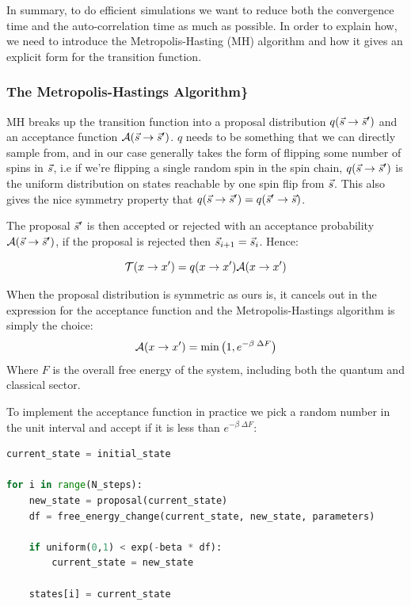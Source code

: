 In summary, to do efficient simulations we want to reduce both the
convergence time and the auto-correlation time as much as possible. In
order to explain how, we need to introduce the Metropolis-Hasting (MH)
algorithm and how it gives an explicit form for the transition function.

\hypertarget{the-metropolis-hastings-algorithm}{%
\subsubsection{The Metropolis-Hastings
Algorithm\}}\label{the-metropolis-hastings-algorithm}}

MH breaks up the transition function into a proposal distribution
\(q(\vec{s} \to \vec{s}')\) and an acceptance function \(\mathcal{A}(\vec{s} \to \vec{s}')\). \(q\)
needs to be something that we can directly sample from, and in our case
generally takes the form of flipping some number of spins in \(\vec{s}\), i.e
if we're flipping a single random spin in the spin chain,
\(q(\vec{s} \to \vec{s}')\) is the uniform distribution on states reachable by one
spin flip from \(\vec{s}\). This also gives the nice symmetry property that
\(q(\vec{s} \to \vec{s}') = q(\vec{s}' \to \vec{s})\).

The proposal \(\vec{s}'\) is then accepted or rejected with an acceptance
probability \(\mathcal{A}(\vec{s} \to \vec{s}')\), if the proposal is rejected then
\(\vec{s}_{i+1} = \vec{s}_{i}\). Hence:

\[\mathcal{T}(x\to x') = q(x\to x')\mathcal{A}(x \to x')\]

When the proposal distribution is symmetric as ours is, it cancels out
in the expression for the acceptance function and the
Metropolis-Hastings algorithm is simply the choice:
\[ \mathcal{A}(x \to x') = \min\left(1, e^{-\beta\;\Delta F}\right)\] Where \(F\)
is the overall free energy of the system, including both the quantum and
classical sector.

To implement the acceptance function in practice we pick a random number
in the unit interval and accept if it is less than
\(e^{-\beta\;\Delta F}\):

\begin{lstlisting}[language=Python]
current_state = initial_state

for i in range(N_steps):
    new_state = proposal(current_state)
    df = free_energy_change(current_state, new_state, parameters)

    if uniform(0,1) < exp(-beta * df):
        current_state = new_state
        
    states[i] = current_state
\end{lstlisting}

